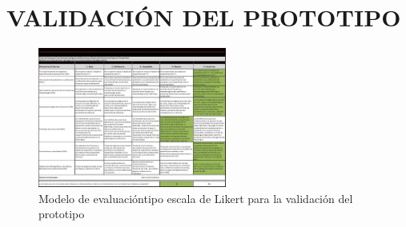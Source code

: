 \documentclass[conference]{IEEEtran}
\begin{document}
\section{VALIDACIÓN DEL PROTOTIPO}


\begin{figure}[ht]
    \centerline{\includegraphics[width=\linewidth, height = 174.6px]{ValidacionPrototipo.jpg}}
    \caption{Modelo de evaluacióntipo escala de Likert para la validación del prototipo}
    \label{fig}
\end{figure}

\newpage
\end{document}
